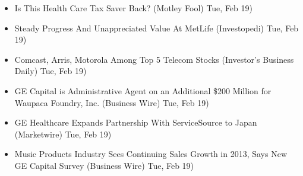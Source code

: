 \documentclass[11pt,asymmetric]{article}
\begin{document}
\begin{itemize}
\item Is This Health Care Tax Saver Back? (Motley Fool) Tue, Feb 19)
\item Steady Progress And Unappreciated Value At MetLife (Investopedi) Tue, Feb 19)
\item Comcast, Arris, Motorola Among Top 5 Telecom Stocks (Investor's Business Daily) Tue, Feb 19)
\item GE Capital is Administrative Agent on an Additional \$200 Million for Waupaca Foundry, Inc. (Business Wire) Tue, Feb 19)
\item GE Healthcare Expands Partnership With ServiceSource to Japan (Marketwire) Tue, Feb 19)
\item Music Products Industry Sees Continuing Sales Growth in 2013, Says New GE Capital Survey (Business Wire) Tue, Feb 19)
\end{itemize}
\end{document}
